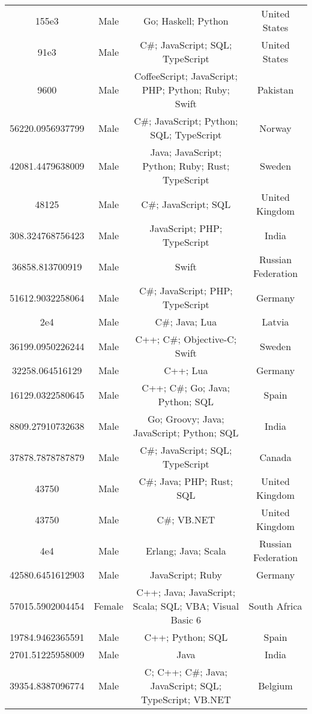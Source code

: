 \begin{center}
\begin{tabular}{ |c|c|c|c| }
155e3  &  Male  &  Go; Haskell; Python  &  United States  \\ 
91e3  &  Male  &  C\#; JavaScript; SQL; TypeScript  &  United States  \\ 
9600  &  Male  &  CoffeeScript; JavaScript; PHP; Python; Ruby; Swift  &  Pakistan  \\ 
56220.0956937799  &  Male  &  C\#; JavaScript; Python; SQL; TypeScript  &  Norway  \\ 
42081.4479638009  &  Male  &  Java; JavaScript; Python; Ruby; Rust; TypeScript  &  Sweden  \\ 
48125  &  Male  &  C\#; JavaScript; SQL  &  United Kingdom  \\ 
308.324768756423  &  Male  &  JavaScript; PHP; TypeScript  &  India  \\ 
36858.813700919  &  Male  &  Swift  &  Russian Federation  \\ 
51612.9032258064  &  Male  &  C\#; JavaScript; PHP; TypeScript  &  Germany  \\ 
2e4  &  Male  &  C\#; Java; Lua  &  Latvia  \\ 
36199.0950226244  &  Male  &  C++; C\#; Objective-C; Swift  &  Sweden  \\ 
32258.064516129  &  Male  &  C++; Lua  &  Germany  \\ 
16129.0322580645  &  Male  &  C++; C\#; Go; Java; Python; SQL  &  Spain  \\ 
8809.27910732638  &  Male  &  Go; Groovy; Java; JavaScript; Python; SQL  &  India  \\ 
37878.7878787879  &  Male  &  C\#; JavaScript; SQL; TypeScript  &  Canada  \\ 
43750  &  Male  &  C\#; Java; PHP; Rust; SQL  &  United Kingdom  \\ 
43750  &  Male  &  C\#; VB.NET  &  United Kingdom  \\ 
4e4  &  Male  &  Erlang; Java; Scala  &  Russian Federation  \\ 
42580.6451612903  &  Male  &  JavaScript; Ruby  &  Germany  \\ 
57015.5902004454  &  Female  &  C++; Java; JavaScript; Scala; SQL; VBA; Visual Basic 6  &  South Africa  \\ 
19784.9462365591  &  Male  &  C++; Python; SQL  &  Spain  \\ 
2701.51225958009  &  Male  &  Java  &  India  \\ 
39354.8387096774  &  Male  &  C; C++; C\#; Java; JavaScript; SQL; TypeScript; VB.NET  &  Belgium  \\ 

\end{tabular}
\end{center}
